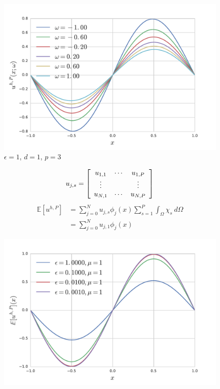 \documentclass{beamer}
\begin{document}
\begin{frame}
    \begin{figure}
        \centering
        \includegraphics[width=0.75\linewidth]{img/oned-stochastic-realisations-1-3.pdf}
        \caption{$\epsilon = 1$, $d = 1$, $p = 3$}
    \end{figure}
\end{frame}

\begin{frame}
    \[
        u_{j,s} = \left[\begin{array}{c c c}
                        u_{1,1} & \cdots & u_{1,P} \\
                        \vdots & & \vdots \\
                        u_{N,1} & \cdots & u_{N, P}
                     \end{array}\right]
    \]
    \pause
    \begin{align*}
        \mathbb{E}[u^{h,P}] &= \sum_{j=0}^Nu_{j,s}\phi_j(x)\sum_{s=1}^P\int_\Omega\chi_s\ d\Omega \\
                            &= \sum_{j=0}^Nu_{j,1}\phi_j(x)
    \end{align*}
\end{frame}

\begin{frame}
    \begin{figure}
        \centering
        \includegraphics[width=0.75\linewidth]{img/oned-stochastic-mean-soln-process.pdf}
    \end{figure}
\end{frame}
\end{document}
